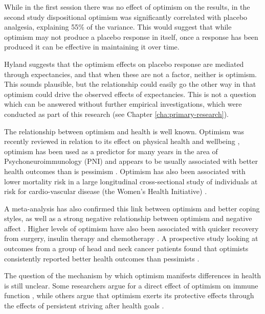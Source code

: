 \documentclass{article}
\begin{document}
While in the first session there was no effect of optimism on the results, in the second study dispositional optimism was significantly correlated with placebo analgesia, explaining 55\% of the variance. This would suggest that while optimism may not produce a placebo response in itself, once a response has been produced it can be effective in maintaining it over time. 

Hyland suggests that the optimism effects on placebo response are mediated through expectancies, and that when these are not a factor, neither is optimism. This sounds plausible, but the relationship could easily go the other way in that optimism could drive the observed effects of expectancies. This is not a question which can be answered without further empirical investigations, which were conducted as part of this research (see Chapter \ref{cha:primary-research}). 


The relationship between optimism and health is well known. 
Optimism was recently reviewed in relation to its 
effect on physical health and wellbeing \cite{Carver2010}, 
optimism has been used as a predictor for many years in the area of Psychoneuroimmunology (PNI)
and appears to be usually associated with better health outcomes than
is pessimism \cite{Baker2007} \cite{Conway2008}. Optimism has also
been associated with lower mortality risk in a large longitudinal
cross-sectional study of individuals at risk for cardio-vascular disease
(the Women's Health Initiative) \cite{Tindle2009}. 

A meta-analysis
has also confirmed this link between optimism and better coping styles,
as well as a strong negative relationship between optimism and negative
affect \cite{andersson1996benefits,Segerstrom2006}. Higher levels
of optimism have also been associated with quicker recovery from surgery,
insulin therapy and chemotherapy \cite{Allison2000}. A prospective
study looking at outcomes from a group of head and neck cancer patients
found that optimists consistently reported better health outcomes
than pessimists \cite{Allison2000}.%

The question of the mechanism by which optimism manifests differences
in health is still unclear. Some researchers argue for a direct effect
of optimism on immune function ,  while others
argue that optimism exerts its protective effects through the effects
of persistent striving after health goals \cite{Segerstrom2003}.
\end{document}
